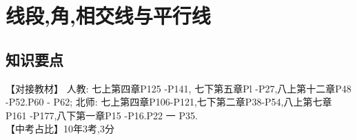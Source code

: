 \documentclass[cn,blue,12pt]{elegantbook}
\begin{document}
\chapter{线段,角,相交线与平行线}%
\section{知识要点}%
\begin{comment}

\end{comment}
\label{cha:线段,角,相交线与平行线}
\begin{note}
  【对接教材】 人教: 七上第四章P125 -P141, 七下第五章Pl -P27,八上第十二章P48 -P52.P60 - P62; 北师: 七上第四章P106-P121,七下第二章P38-P54,八上第七章P161 -P177,八下第一章P15 -P16.P22 一 P35.\\
  【中考占比】10年3考,3分
\end{note}
\end{document}
